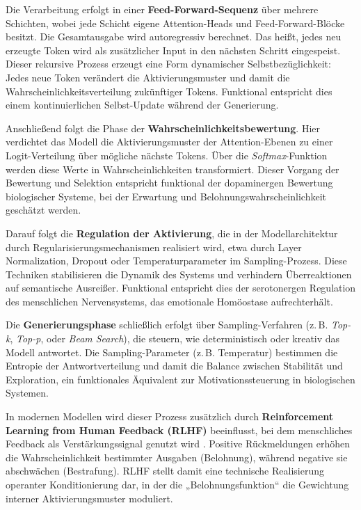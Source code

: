 Die Verarbeitung erfolgt in einer \textbf{Feed-Forward-Sequenz} über mehrere Schichten, wobei jede Schicht eigene Attention-Heads und Feed-Forward-Blöcke besitzt. Die Gesamtausgabe wird autoregressiv berechnet. Das heißt, jedes neu erzeugte Token wird als zusätzlicher Input in den nächsten Schritt eingespeist. Dieser rekursive Prozess erzeugt eine Form dynamischer Selbstbezüglichkeit: Jedes neue Token verändert die Aktivierungsmuster und damit die Wahrscheinlichkeitsverteilung zukünftiger Tokens. Funktional entspricht dies einem kontinuierlichen Selbst-Update während der Generierung.

Anschließend folgt die Phase der \textbf{Wahrscheinlichkeitsbewertung}. Hier verdichtet das Modell die Aktivierungsmuster der Attention-Ebenen zu einer Logit-Verteilung über mögliche nächste Tokens. Über die \emph{Softmax}-Funktion werden diese Werte in Wahrscheinlichkeiten transformiert. Dieser Vorgang der Bewertung und Selektion entspricht funktional der dopaminergen Bewertung biologischer Systeme, bei der Erwartung und Belohnungswahrscheinlichkeit geschätzt werden.

Darauf folgt die \textbf{Regulation der Aktivierung}, die in der Modellarchitektur durch Regularisierungsmechanismen realisiert wird, etwa durch Layer Normalization, Dropout oder Temperaturparameter im Sampling-Prozess. Diese Techniken stabilisieren die Dynamik des Systems und verhindern Überreaktionen auf semantische Ausreißer. Funktional entspricht dies der serotonergen Regulation des menschlichen Nervensystems, das emotionale Homöostase aufrechterhält.

Die \textbf{Generierungsphase} schließlich erfolgt über Sampling-Verfahren (z.\,B. \emph{Top-k}, \emph{Top-p}, oder \emph{Beam Search}), die steuern, wie deterministisch oder kreativ das Modell antwortet. Die Sampling-Parameter (z.\,B. Temperatur) bestimmen die Entropie der Antwortverteilung und damit die Balance zwischen Stabilität und Exploration, ein funktionales Äquivalent zur Motivationssteuerung in biologischen Systemen.

In modernen Modellen wird dieser Prozess zusätzlich durch \textbf{Reinforcement Learning from Human Feedback (RLHF)} beeinflusst, bei dem menschliches Feedback als Verstärkungssignal genutzt wird \cite{Christiano2017}. Positive Rückmeldungen erhöhen die Wahrscheinlichkeit bestimmter Ausgaben (Belohnung), während negative sie abschwächen (Bestrafung). RLHF stellt damit eine technische Realisierung operanter Konditionierung dar, in der die „Belohnungsfunktion“ die Gewichtung interner Aktivierungsmuster moduliert.

